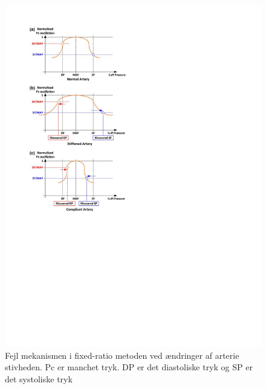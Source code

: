 \begin{minipage}[t]{0.5\textwidth}
	\begin{figure}[H]
		\centering
		\includegraphics[width=1\textwidth]{billeder/ErrorFixed-Ratio.pdf}
		\caption{Fejl mekanismen i fixed-ratio metoden ved ændringer af arterie stivheden. Pc er manchet tryk. DP er det diastoliske tryk og SP er det systoliske tryk}\label{fig:ErrorMechanismOfFixedRatio}
	\end{figure}
\end{minipage}





